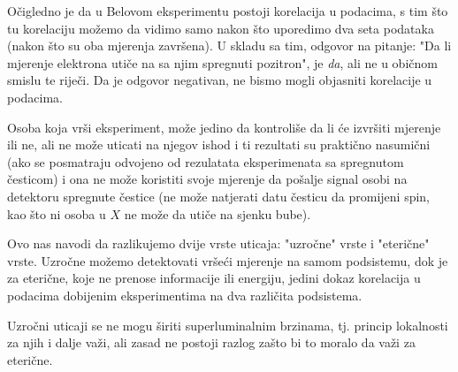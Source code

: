O\v cigledno je da u Belovom eksperimentu postoji korelacija u podacima, s tim \v sto tu korelaciju mo\v zemo da vidimo
samo nakon \v sto uporedimo dva seta podataka (nakon \v sto su oba mjerenja zavr\v sena).
U skladu sa tim, odgovor na pitanje: "Da li mjerenje elektrona uti\v ce na sa njim spregnuti pozitron", je {\it{da}}, ali ne u obi\v cnom smislu te rije\v ci.
Da je odgovor negativan, ne bismo mogli objasniti korelacije u podacima.

Osoba koja vr\v si eksperiment, mo\v ze jedino da kontroli\v se da li \' ce izvr\v siti mjerenje ili ne, ali ne mo\v ze uticati na njegov ishod i ti rezultati su prakti\v cno
nasumi\v cni (ako se posmatraju odvojeno od rezulatata eksperimenata sa spregnutom \v cesticom) i ona ne mo\v ze koristiti svoje mjerenje da po\v salje signal osobi
na detektoru spregnute \v cestice (ne mo\v ze natjerati datu \v cesticu da promijeni spin, kao \v sto ni osoba u $X$ ne mo\v ze da uti\v ce na sjenku bube).

Ovo nas navodi da razlikujemo dvije vrste uticaja: "uzro\v cne" vrste i "eteri\v cne" vrste.
Uzro\v cne mo\v zemo detektovati vr\v se\' ci mjerenje na samom podsistemu, dok je za eteri\v cne, koje ne prenose informacije ili energiju, jedini dokaz
korelacija u podacima dobijenim eksperimentima na dva razli\v cita podsistema.

Uzro\v cni uticaji se ne mogu \v siriti superluminalnim brzinama, tj. princip lokalnosti za njih i dalje važi, ali zasad ne postoji razlog za\v sto bi to moralo da va\v zi za eteri\v cne.